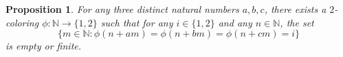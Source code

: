 \documentclass[reqno,12pt]{amsart}
\newtheorem{prop}[thm]{Proposition}
\def \N {\mathbb N}
\numberwithin{equation}{section}
\begin{document}
\begin{prop}\label{P2}
	For any three distinct natural numbers $a,b,c$, there exists a $2$-coloring $\phi:\N\rightarrow \{1,2\}$ such that for any $i\in \{1,2\}$ and any $n\in \N$, the set $$\{m\in \N:\phi(n+am)=\phi(n+bm)=\phi(n+cm)=i\}$$ is empty or finite.
\end{prop}
%
\end{document}
